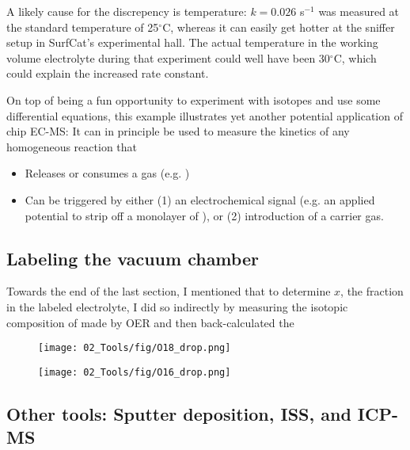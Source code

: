 A likely cause for the discrepency is temperature: $k=0.026$ s$^{-1}$ was measured at the standard temperature of 25$^\circ$C, whereas it can easily get hotter at the sniffer setup in SurfCat's experimental hall. The actual temperature in the working volume electrolyte during that experiment could well have been 30$^\circ$C, which could explain the increased rate constant.

On top of being a fun opportunity to experiment with isotopes and use some differential equations, this example illustrates yet another potential application of chip EC-MS: It can in principle be used to measure the kinetics of any homogeneous reaction that
\begin{itemize}
	\item Releases or consumes a gas (e.g. )
	\item Can be triggered by either (1) an electrochemical signal (e.g. an applied potential to strip off a monolayer of ), or (2) introduction of a carrier gas.
\end{itemize}


\subsection{Labeling the vacuum chamber}\label{subsec:vacuum_transport}

Towards the end of the last section, I mentioned that to determine $x$, the fraction  in the labeled electrolyte, I did so indirectly by measuring the isotopic composition of  made by OER and then back-calculated the 

\begin{figure}[h!]
	\centering
	\texttt{[image: 02\_Tools/fig/O18\_drop.png]}
	\caption{}
	\label{fig:O18_drop}
\end{figure}

\begin{figure}[h!]
	\centering
	\texttt{[image: 02\_Tools/fig/O16\_drop.png]}
	\caption{}
	\label{O16_drop}
\end{figure}



\subsection{Other tools: Sputter deposition, ISS, and ICP-MS}\label{subsec:other_tools}

